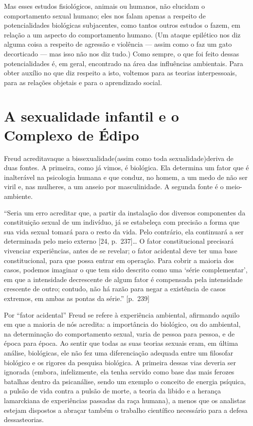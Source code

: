  Mas esses estudos fisiológicos, animais ou humanos, não elucidam o
comportamento sexual humano; eles nos falam apenas a respeito de
potencialidades biológicas subjacentes, como tantos outros estudos o
fazem, em relação a um aspecto do comportamento humano. (Um ataque
epilético nos diz alguma coisa a respeito de agressão e violência ---
assim como o faz um gato decorticado --- mas isso não nos diz tudo.)
Como sempre, o que foi feito dessas potencialidades é, em geral,
encontrado na área das influências ambientais. Para obter auxílio no
que diz respeito a isto, voltemos para as teorias interpessoais, para
as relações objetais e para o aprendizado social.

\section{A sexualidade infantil e o Complexo de Édipo}

Freud acreditava\idxbisseteor[|(] que a\idxconfe{} bissexualidade\idxsexui[|(] (assim como toda sexualidade)\idxinfansexua[|(]
deriva de duas fontes. A primeira, como já vimos, é biológica. Ela
determina um fator que é inalterável na psicologia humana e que conduz,
no homem, a um medo de não ser viril e, nas mulheres, a um anseio por
masculinidade. A segunda fonte é o meio-ambiente.

``Seria um erro acreditar que, a partir da instalação
dos diversos componentes da constituição sexual de um indivíduo, já se
estabeleça com precisão a forma que sua vida sexual tomará para o resto
da vida. Pelo contrário, ela continuará a ser determinada pelo meio
externo [24, p.~237]\ldots{} O fator constitucional precisará vivenciar
experiências, antes de se revelar; o fator acidental deve ter uma base
constitucional, para que possa entrar em operação. Para cobrir a
maioria dos casos, podemos imaginar o que tem sido descrito como uma
`série complementar', em que a intensidade decrescente de algum fator
é compensada pela intensidade crescente de outro; contudo, não há razão
para negar a existência de casos extremos, em ambas as pontas da série.'' [p.~239]

Por ``fator acidental'' Freud\idxfreudinsti{} se refere à
experiência ambiental, afirmando aquilo em que a maioria de nós
acredita: a importância do biológico, ou do ambiental, na determinação
do comportamento sexual, varia de pessoa para pessoa, e de época para
época. Ao sentir que todas as suas teorias sexuais eram, em última
análise, biológicas, ele não fez uma diferenciação adequada entre um
filosofar biológico e os rigores da pesquisa biológica. A primeira
dessas vias deveria ser ignorada (embora, infelizmente, ela tenha
servido como base das mais ferozes batalhas dentro da psicanálise,
sendo um exemplo o conceito de energia psíquica,\idxenerg{} a pulsão de vida
contra a pulsão de morte, a teoria da libido\idxlibid{} e a herança lamarckiana de
experiências passadas da raça humana), a menos que os analistas estejam
dispostos a abraçar também o trabalho científico necessário para a
defesa dessas\idxfreudbiolo[|)] teorias.

